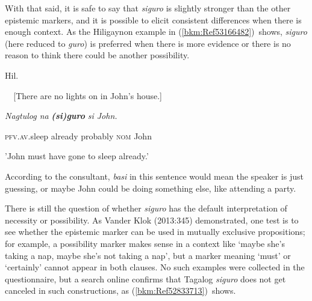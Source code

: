 \begin{styleStandard}
With that said, it is safe to say that \textit{siguro} is slightly stronger than the other epistemic markers, and it is possible to elicit consistent differences when there is enough context. As the Hiligaynon example in (\ref{bkm:Ref53166482})\ shows, \textit{siguro} (here reduced to \textit{guro})\textit{ }is preferred when there is more evidence or there is no reason to think there could be another possibility.
\end{styleStandard}

\begin{listWWNumiileveli}
\item 
\begin{stylelsLanginfo}
\label{bkm:Ref53166482}Hil.
\end{stylelsLanginfo}
\end{listWWNumiileveli}
\begin{styleStandard}
\textit{\ \ }[There are no lights on in John’s house.]
\end{styleStandard}

\begin{stylelsLanginfo}
\textit{Nagtulog na }\textbf{\textit{(si)guro}}\textit{ si John.}
\end{stylelsLanginfo}

\begin{stylelsLanginfo}
\textsc{pfv.av.}sleep already probably \textsc{nom} John
\end{stylelsLanginfo}

\begin{stylelsLanginfo}
{}'John must have gone to sleep already.'
\end{stylelsLanginfo}

\begin{styleStandard}
According to the consultant, \textit{basi} in this sentence would mean the speaker is just guessing, or maybe John could be doing something else, like attending a party. 
\end{styleStandard}

\begin{styleStandard}
There is still the question of whether \textit{siguro} has the default interpretation of necessity or possibility. As Vander Klok (2013:345) demonstrated, one test is to see whether the epistemic marker can be used in mutually exclusive propositions; for example, a possibility marker makes sense in a context like ‘maybe she's taking a nap, maybe she's not taking a nap’, but a marker meaning ‘must’ or ‘certainly’ cannot appear in both clauses. No such examples were collected in the questionnaire, but a search online confirms that Tagalog \textit{siguro }does not get canceled in such constructions, as (\ref{bkm:Ref52833713})\ shows. 
\end{styleStandard}

